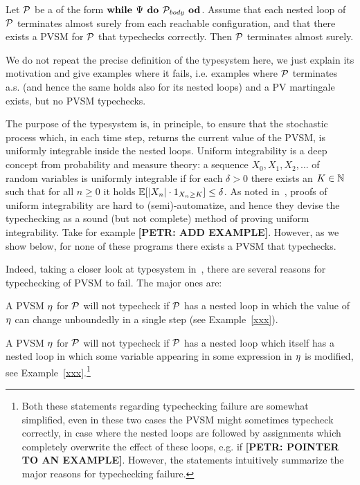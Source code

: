 \begin{theorem}
\label{thm:holger-comp}
Let $\mathcal{P}$ be a \PP{} of the form $\textbf{while } \Psi \textbf{ do } 
\mathcal{P}_{\mathit{body}} \textbf{ od}$. Assume that each nested loop of $\mathcal{P}$ terminates almost surely from each reachable configuration, and that there exists a PVSM for $\mathcal{P}$ that typechecks correctly. Then $\mathcal{P}$ terminates almost surely.
\end{theorem}

We do not repeat the precise definition of the typesystem here, we just explain its motivation and give examples where it fails, i.e. examples where $\mathcal{P}$ terminates a.s. (and hence the same holds also for its nested loops) and a PV martingale exists, but no PVSM typechecks.  

The purpose of the typesystem is, in principle, to ensure that the stochastic process which, in each time step, returns the current value of the PVSM, is uniformly integrable inside the nested loops. Uniform integrability is a deep concept from probability and measure theory: a sequence $X_0,X_1,X_2,\dots$ of random variables is uniformly integrable if for each $\delta>0$ there exists an $K\in \mathbb{N}$ such that for all $n\geq 0$ it holds $\mathbb{E}[|X_n|\cdot{1}_{X_n \geq K}]\leq \delta$. As noted in~\cite{HolgerPOPL}, proofs of uniform integrability are hard to (semi)-automatize, and hence they devise the typechecking as a sound (but not complete) method of proving uniform integrability. Take for example \textbf{[PETR: ADD EXAMPLE]}. However, as we show below, for none of these programs there exists a PVSM that typechecks. 

Indeed, taking a closer look at typesystem in~\cite{HolgerPOPL}, there are several reasons for typechecking of PVSM to fail. The major ones are:
\begin{compactenum}
\item
A PVSM $\eta$ for \PP{} $\mathcal{P}$ will not typecheck if $\mathcal{P}$ has a nested loop in which the value of $\eta$ can change unboundedly in a single step (see Example~\ref{xxx}). 
\item
A PVSM $\eta$ for  \PP{} $\mathcal{P}$ will not typecheck if $\mathcal{P}$ has a nested loop which itself has a nested loop in which some variable appearing in some expression in $\eta$ is modified, see Example~\ref{xxx}.\footnote{Both these statements regarding typechecking failure are somewhat simplified, even in these two cases the PVSM might sometimes typecheck correctly, in case where the nested loops are followed by assignments which completely overwrite the effect of these loops, e.g. if \textbf{[PETR: POINTER TO AN EXAMPLE]}. However, the statements intuitively summarize the major reasons for typechecking failure. }
\end{compactenum}

